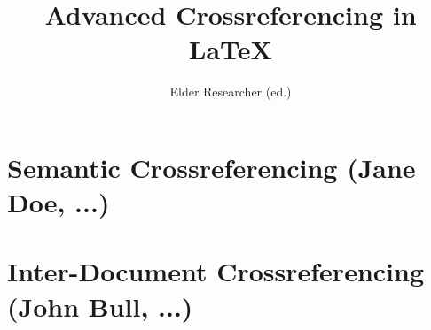 \documentclass{report}
\title{Advanced Crossreferencing in {\LaTeX}}
\author{Elder Researcher (ed.)}
\begin{document}
\maketitle
\tableofcontents
\newpage
\chapter{Semantic Crossreferencing (Jane Doe, ...)}
\newpage
\chapter{Inter-Document Crossreferencing (John Bull, ...)}
 
\end{document}
